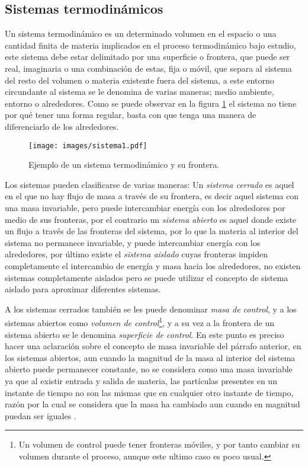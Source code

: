 \documentclass[../master.tex]{subfiles}
\begin{document}
\subsection{Sistemas termodinámicos}

Un sistema termodinámico es un determinado volumen en el espacio o una cantidad finita de materia implicados en el proceso termodinámico bajo estudio, este sistema debe estar delimitado por una superficie o frontera, que puede ser real, imaginaria o una combinación de estas, fija o móvil, que separa al sistema del resto del volumen o materia existente fuera del sistema, a este entorno circundante al sistema se le denomina de varias maneras; medio ambiente, entorno o alrededores. Como se puede observar en la figura \ref{fig:exp_sistema} el sistema no tiene por qué tener una forma regular, basta con que tenga una manera de diferenciarlo de los alrededores.

\begin{figure}[htbp]
    \centering
    \texttt{[image: images/sistema1.pdf]}
    \caption{Ejemplo de un sistema termodinámico y su frontera.}
    \label{fig:exp_sistema}
\end{figure}

Los sistemas pueden clasificarse de varias maneras: Un \emph{sistema cerrado} es aquel en el que no hay flujo de masa a través de su frontera, es decir aquel sistema con una masa invariable, pero puede intercambiar energía con los alrededores por medio de sus fronteras, por el contrario un \emph{sistema abierto} es aquel donde existe un flujo a través de las fronteras del sistema, por lo que la materia al interior del sistema no permanece invariable, y puede intercambiar energía con los alrededores, por último existe el \emph{sistema aislado} cuyas fronteras impiden completamente el intercambio de energía y masa hacia los alrededores, no existen sistemas completamente aislados pero se puede utilizar el concepto de sistema aislado para aproximar diferentes sistemas.

A los sistemas cerrados también se les puede denominar \emph{masa de control}, y a los sistemas abiertos como \emph{volumen de control}\footnote{Un volumen de control puede tener fronteras móviles, y por tanto cambiar su volumen durante el proceso, aunque este ultimo caso es poco usual.}, y a su vez a la frontera de un sistema abierto se le denomina \emph{superficie de control}. En este punto es preciso hacer una aclaración sobre el concepto de masa invariable del párrafo anterior, en los sistemas abiertos, aun cuando la magnitud de la masa al interior del sistema abierto puede permanecer constante, no se considera como una masa invariable ya que al existir entrada y salida de materia, las partículas presentes en un instante de tiempo no son las mismas que en cualquier otro instante de tiempo, razón por la cual se considera que la masa ha cambiado aun cuando en magnitud puedan ser iguales \parencites{clavell}{faires}{wark}.
\end{document}
